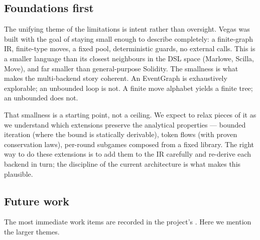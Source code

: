 \subsection{Foundations first}

The unifying theme of the limitations is intent rather than
oversight.  Vegas was built with the goal of staying small
enough to describe completely: a finite-graph IR,
finite-type moves, a fixed pool, deterministic guards, no
external calls.
This is a smaller language than its closest neighbours in the
DSL space (Marlowe, Scilla, Move), and far smaller than
general-purpose Solidity.  The smallness is what makes the
multi-backend story coherent.  An EventGraph is exhaustively
explorable; an unbounded loop is not.  A finite move alphabet
yields a finite tree; an unbounded  does not.

That smallness is a starting point, not a ceiling.  We expect to
relax pieces of it as we understand which extensions preserve
the analytical properties --- bounded iteration (where the
bound is statically derivable), token flows (with proven
conservation laws), per-round subgames composed from a fixed
library.  The right way to do these extensions is to add them
to the IR carefully and re-derive each backend in turn; the
discipline of the current architecture is what makes this
plausible.

\subsection{Future work}

The most immediate work items are recorded in the project's
.  Here we mention the larger themes.

